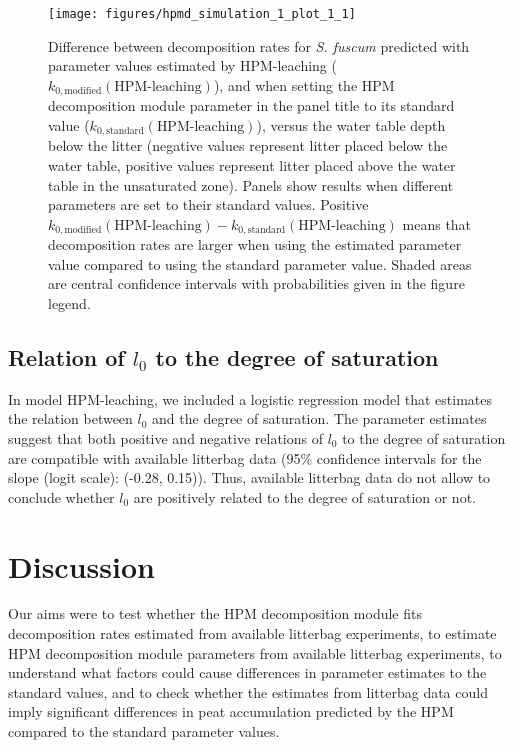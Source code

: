 \documentclass[esd, manuscript]{copernicus}
\begin{document}
\begin{figure}[H]

{\centering \texttt{[image: figures/hpmd\_simulation\_1\_plot\_1\_1]} 

}

\caption{Difference between decomposition rates for \emph{S. fuscum} predicted with parameter values estimated by HPM-leaching (\(k_{0,\text{modified}}(\text{HPM-leaching})\)), and when setting the HPM decomposition module parameter in the panel title to its standard value (\(k_{0,\text{standard}}(\text{HPM-leaching})\)), versus the water table depth below the litter (negative values represent litter placed below the water table, positive values represent litter placed above the water table in the unsaturated zone). Panels show results when different parameters are set to their standard values. Positive \(k_{0,\text{modified}}(\text{HPM-leaching}) - k_{0,\text{standard}}(\text{HPM-leaching})\) means that decomposition rates are larger when using the estimated parameter value compared to using the standard parameter value. Shaded areas are central confidence intervals with probabilities given in the figure legend.}\label{fig:out-sdm-parameters-standard-vs-estimated-p1}
\end{figure}

\subsection{\texorpdfstring{Relation of \(l_0\) to the degree of saturation}{Relation of l\_0 to the degree of saturation}}

In model HPM-leaching, we included a logistic regression model that estimates the relation between \(l_0\) and the degree of saturation. The parameter estimates suggest that both positive and negative relations of \(l_0\) to the degree of saturation are compatible with available litterbag data (95\% confidence intervals for the slope (logit scale): (-0.28, 0.15)). Thus, available litterbag data do not allow to conclude whether \(l_0\) are positively related to the degree of saturation or not.

\section{Discussion}

Our aims were to test whether the HPM decomposition module fits decomposition rates estimated from available litterbag experiments, to estimate HPM decomposition module parameters from available litterbag experiments, to understand what factors could cause differences in parameter estimates to the standard values, and to check whether the estimates from litterbag data could imply significant differences in peat accumulation predicted by the HPM compared to the standard parameter values.
\end{document}
